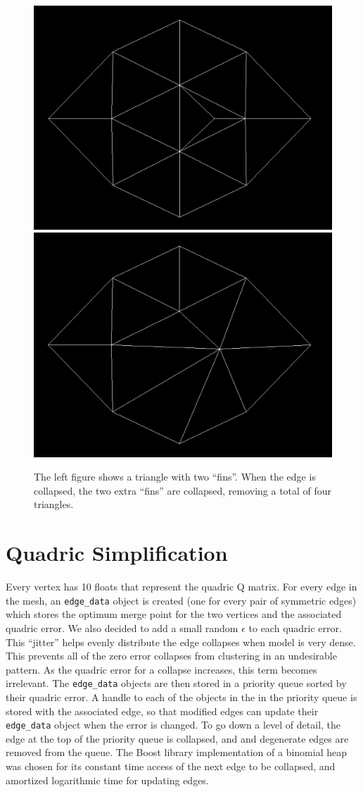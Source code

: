 \documentclass[11pt]{article}
\begin{document}
\begin{figure}
  \begin{center}
    \includegraphics[width=.30\linewidth]{figs/fin1}
    \includegraphics[width=.30\linewidth]{figs/fin2}
  \end{center}

  \caption{The left figure shows a triangle with two ``fins''. When the edge is collapsed, the two extra ``fins'' are collapsed, removing a total of four triangles.}

\end{figure}

\section{Quadric Simplification}

Every vertex has 10 floats that represent the quadric Q matrix. For every edge in the mesh, an \verb`edge_data` object is created (one for every pair of symmetric edges) which stores the optimum merge point for the two vertices and the associated quadric error. We also decided to add a small random $\epsilon$ to each quadric error. This ``jitter'' helps evenly distribute the edge collapses when model is very dense. This prevents all of the zero error collapses from clustering in an undesirable pattern. As the quadric error for a collapse increases, this term becomes irrelevant. The \verb`edge_data` objects are then stored in a priority queue sorted by their quadric error. A handle to each of the objects in the in the priority queue is stored with the associated edge, so that modified edges can update their \verb`edge_data` object when the error is changed. To go down a level of detail, the edge at the top of the priority queue is collapsed, and and degenerate edges are removed from the queue. The Boost library implementation of a binomial heap was chosen for its constant time access of the next edge to be collapsed, and amortized logarithmic time for updating edges.
\end{document}
